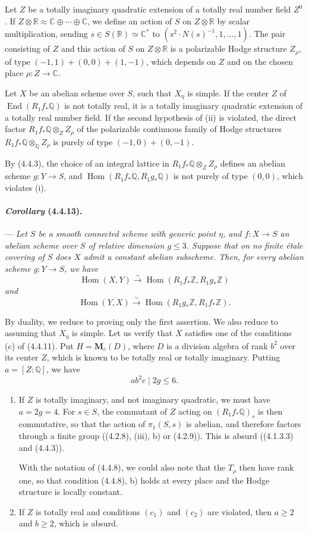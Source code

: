 \documentclass[10pt]{article}
\newcommand{\C}{\mathbb C}
\newcommand{\Q}{\mathbb Q}
\newcommand{\Z}{\mathbb Z}
\newcommand{\Hom}{\operatorname{Hom}}
\newcommand{\iso}{\xrightarrow{\sim}}
\newcommand{\R}{\mathbb R}
\providecommand{\End}{\operatorname{End}}
\begin{document}
Let $Z$ be a totally imaginary quadratic extension of a totally real number field $Z^0$. If $Z\otimes\R\approx \C\oplus\cdots\oplus\C$, we define an action of $S$ on $Z\otimes\R$ by scalar multiplication, sending $s\in S(\R)\simeq\C^*$ to $(s^2\cdot N(s)^{-1},1,\ldots,1)$. The pair consisting of $Z$ and this action of $S$ on $Z\otimes\R$ is a polarizable Hodge structure $Z_\rho$, of type $(-1,1)+(0,0)+(1,-1)$, which depends on $Z$ and on the chosen place $\rho:Z\to\C$.

Let $X$ be an abelian scheme over $S$, such that $X_\eta$ is simple. If the center $Z$ of $\End(R_1f_*\Q)$ is not totally real, it is a totally imaginary quadratic extension of a totally real number field. If the second hypothesis of (ii) is violated, the direct factor $R_1f_*\Q\otimes_Z Z_\rho$ of the polarizable continuous family of Hodge structures $R_1f_*\Q\otimes_\Q Z_\rho$ is purely of type $(-1,0)+(0,-1)$.

By (4.4.3), the choice of an integral lattice in $R_1f_*\Q\otimes_Z Z_\rho$ defines an abelian scheme $g:Y\to S$, and $\Hom(R_1f_*\Q,R_1g_*\Q)$ is not purely of type $(0,0)$, which violates (i).

\paragraph{\emph{Corollary} (4.4.13).} --- {\itshape Let $S$ be a smooth connected scheme with generic point $\eta$, and $f:X\to S$ an abelian scheme over $S$ of relative dimension $g\le3$. Suppose that on no finite étale covering of $S$ does $X$ admit a constant abelian subscheme. Then, for every abelian scheme $g:Y\to S$, we have
\[
\Hom(X,Y)\iso \Hom(R_1f_*\Z,R_1g_*\Z)
\]
and
\[
\Hom(Y,X)\iso \Hom(R_1g_*\Z,R_1f_*\Z).
\]}

By duality, we reduce to proving only the first assertion. We also reduce to assuming that $X_\eta$ is simple. Let us verify that $X$ satisfies one of the conditions (c) of (4.4.11). Put $H=\mathbf{M}_c(D)$, where $D$ is a division algebra of rank $b^2$ over its center $Z$, which is known to be totally real or totally imaginary. Putting $a=[Z:\Q]$, we have
\[
\tag{4.4.13.1}
ab^2c\mid 2g\le6.
\]


\begin{enumerate}[label=\arabic*)]
\item If $Z$ is totally imaginary, and not imaginary quadratic, we must have $a=2g=4$. For $s\in S$, the commutant of $Z$ acting on $(R_1f_*\Q)_s$ is then commutative, so that the action of $\pi_1(S,s)$ is abelian, and therefore factors through a finite group ((4.2.8), (iii), b) or (4.2.9)). This is absurd ((4.1.3.3) and (4.4.3)).

With the notation of (4.4.8), we could also note that the $T_\rho$ then have rank one, so that condition (4.4.8), b) holds at every place and the Hodge structure is locally constant.

\item If $Z$ is totally real and conditions $(c_1)$ and $(c_2)$ are violated, then $a\ge2$ and $b\ge2$, which is absurd.
\end{enumerate}
\end{document}
